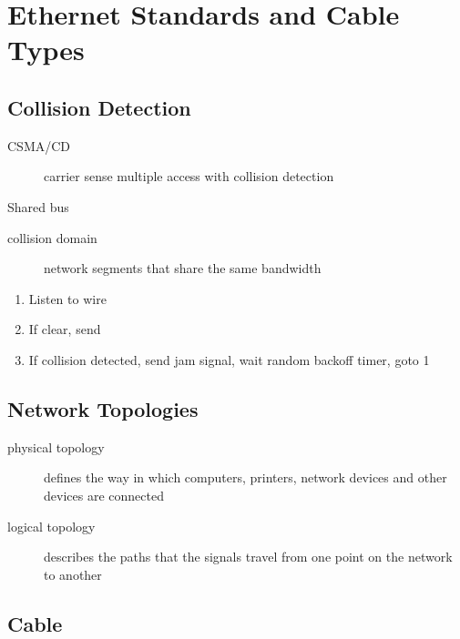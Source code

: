\section{Ethernet Standards and Cable Types}

\subsection{Collision Detection}

\begin{description}

\item[CSMA/CD]
carrier sense multiple access with collision detection

\end{description}

Shared bus

\begin{description}

\item[collision domain]
network segments that share the same bandwidth

\end{description}

\begin{enumerate}

\item Listen to wire
\item If clear, send
\item If collision detected, send jam signal, wait random backoff timer, goto 1

\end{enumerate}

\subsection{Network Topologies}

\begin{description}

\item[physical topology]
defines the way in which computers, printers, network devices and other devices
are connected

\item[logical topology]
describes the paths that the signals travel from one point on the network to
another

\end{description}

\subsection{Cable}

